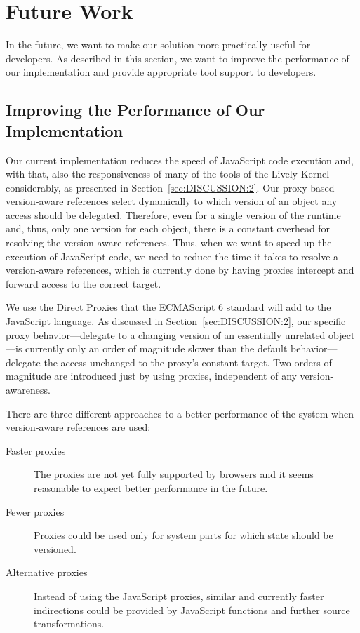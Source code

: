 \chapter{Future Work} \label{chapter:FUTURE_WORK}

In the future, we want to make our solution more practically useful for developers.
As described in this section, we want to improve the performance of our implementation and provide appropriate tool support to developers.



\section{Improving the Performance of Our Implementation} \label{sec:FUTURE_WORK:1}

Our current implementation reduces the speed of JavaScript code execution and, with that, also the responsiveness of many of the tools of the Lively Kernel considerably, as presented in Section~\ref{sec:DISCUSSION:2}.
Our proxy-based version-aware references select dynamically to which version of an object any access should be delegated.
Therefore, even for a single version of the runtime and, thus, only one version for each object, there is a constant overhead for resolving the version-aware references.
Thus, when we want to speed-up the execution of JavaScript code, we need to reduce the time it takes to resolve a version-aware references, which is currently done by having proxies intercept and forward access to the correct target.

We use the Direct Proxies that the ECMAScript 6 standard will add to the JavaScript language.
As discussed in Section~\ref{sec:DISCUSSION:2}, our specific proxy behavior---delegate to a changing version of an essentially unrelated object---is currently only an order of magnitude slower than the default behavior---delegate the access unchanged to the proxy's constant target.
Two orders of magnitude are introduced just by using proxies, independent of any version-awareness.

There are three different approaches to a better performance of the system when version-aware references are used:

\begin{description}
    \item[Faster proxies] The proxies are not yet fully supported by browsers and it seems reasonable to expect better performance in the future.
    \item[Fewer proxies] Proxies could be used only for system parts for which state should be versioned.
    \item[Alternative proxies] Instead of using the JavaScript proxies, similar and currently faster indirections could be provided by JavaScript functions and further source transformations.
\end{description}

